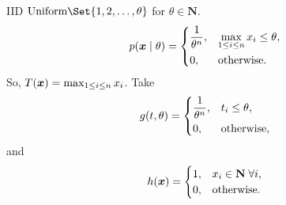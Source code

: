 \begin{Example}{}{}
    IID $ \text{Uniform}\Set{1,2,\ldots,\theta} $ for $ \theta\in\mathbf{N} $.
    \[ p(\bm{x}\mid \theta)=
        \begin{dcases}
            \frac{1}{\theta^n}, & \operatorname*{max}_{1\le i\le n}x_i\le \theta, \\
            0,                  & \text{otherwise}.
        \end{dcases} \]
    So,
    $ T(\bm{x})=\operatorname*{max}_{1\le i\le n}x_i $.
    Take
    \[ g(t,\theta)=
        \begin{dcases}
            \frac{1}{\theta^n}, & t_i\le \theta,    \\
            0,                  & \text{otherwise},
        \end{dcases} \]
    and
    \[ h(\bm{x})=\begin{cases}
            1, & x_i\in\mathbf{N}\; \forall i, \\
            0, & \text{otherwise}.
        \end{cases} \]


\end{Example}